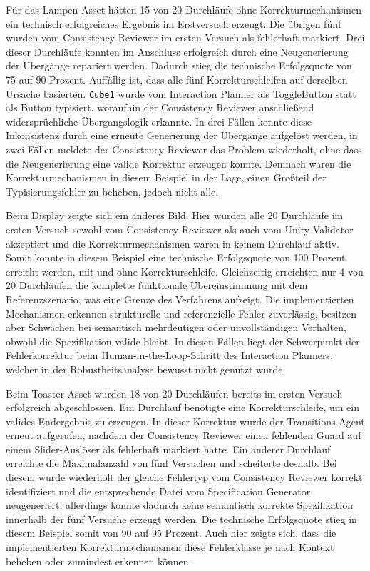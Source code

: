Für das Lampen-Asset hätten 15 von 20 Durchläufe ohne Korrekturmechanismen ein technisch erfolgreiches Ergebnis im Erstversuch erzeugt. Die übrigen fünf wurden vom Consistency Reviewer im ersten Versuch als fehlerhaft markiert. Drei dieser Durchläufe konnten im Anschluss erfolgreich durch eine Neugenerierung der Übergänge repariert werden. Dadurch stieg die technische Erfolgsquote von 75 auf 90 Prozent. Auffällig ist, dass alle fünf Korrekturschleifen auf derselben Ursache basierten. \texttt{Cube1} wurde vom Interaction Planner als ToggleButton statt als Button typisiert, woraufhin der Consistency Reviewer anschließend widersprüchliche Übergangslogik erkannte. In drei Fällen konnte diese Inkonsistenz durch eine erneute Generierung der Übergänge aufgelöst werden, in zwei Fällen meldete der Consistency Reviewer das Problem wiederholt, ohne dass die Neugenerierung eine valide Korrektur erzeugen konnte. Demnach waren die Korrekturmechanismen in diesem Beispiel in der Lage, einen Großteil der Typisierungsfehler zu beheben, jedoch nicht alle.

Beim Display zeigte sich ein anderes Bild. Hier wurden alle 20 Durchläufe im ersten Versuch sowohl vom Consistency Reviewer als auch vom Unity-Validator akzeptiert und die Korrekturmechanismen waren in keinem Durchlauf aktiv. Somit konnte in diesem Beispiel eine technische Erfolgsquote von 100 Prozent erreicht werden, mit und ohne Korrekturschleife. Gleichzeitig erreichten nur 4 von 20 Durchläufen die komplette funktionale Übereinstimmung mit dem Referenzszenario, was eine Grenze des Verfahrens aufzeigt. Die implementierten Mechanismen erkennen strukturelle und referenzielle Fehler zuverlässig, besitzen aber Schwächen bei semantisch mehrdeutigen oder unvollständigen Verhalten, obwohl die Spezifikation valide bleibt. In diesen Fällen liegt der Schwerpunkt der Fehlerkorrektur beim Human-in-the-Loop-Schritt des Interaction Planners, welcher in der Robustheitsanalyse bewusst nicht genutzt wurde.

Beim Toaster-Asset wurden 18 von 20 Durchläufen bereits im ersten Versuch erfolgreich abgeschlossen. Ein Durchlauf benötigte eine Korrekturschleife, um ein valides Endergebnis zu erzeugen. In dieser Korrektur wurde der Transitions-Agent erneut aufgerufen, nachdem der Consistency Reviewer einen fehlenden Guard auf einem Slider-Auslöser als fehlerhaft markiert hatte. Ein anderer Durchlauf erreichte die Maximalanzahl von fünf Versuchen und scheiterte deshalb. Bei diesem wurde wiederholt der gleiche Fehlertyp vom Consistency Reviewer korrekt identifiziert und die entsprechende Datei vom Specification Generator neugeneriert, allerdings konnte dadurch keine semantisch korrekte Spezifikation innerhalb der fünf Versuche erzeugt werden. Die technische Erfolgsquote stieg in diesem Beispiel somit von 90 auf 95 Prozent. Auch hier zeigte sich, dass die implementierten Korrekturmechanismen diese Fehlerklasse je nach Kontext beheben oder zumindest erkennen können.

